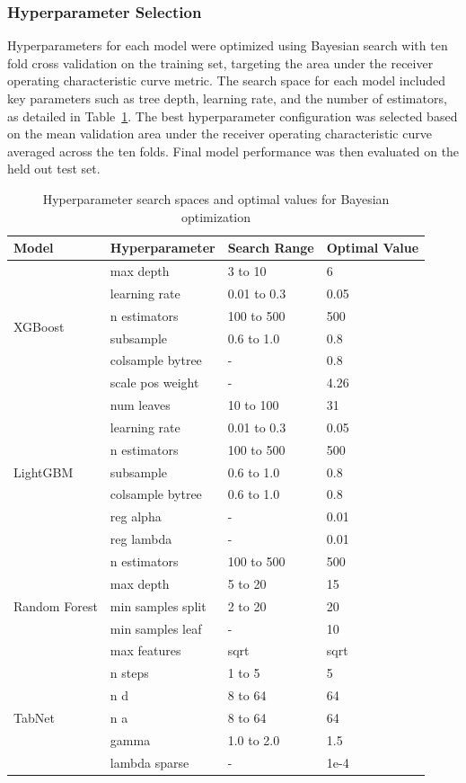 \documentclass[harvard,article]{frontiersinFPHY_FAMS}
\begin{document}
\subsubsection{Hyperparameter Selection}

Hyperparameters for each model were optimized using Bayesian search with ten fold cross validation on the training set, targeting the area under the receiver operating characteristic curve metric. The search space for each model included key parameters such as tree depth, learning rate, and the number of estimators, as detailed in Table~\ref{tab:hyperparameters}. The best hyperparameter configuration was selected based on the mean validation area under the receiver operating characteristic curve averaged across the ten folds. Final model performance was then evaluated on the held out test set.

\begin{table}[t]
\centering
\caption{Hyperparameter search spaces and optimal values for Bayesian optimization}
\label{tab:hyperparameters}
\begin{tabular}{l l l l}
\toprule
\textbf{Model} & \textbf{Hyperparameter} & \textbf{Search Range} & \textbf{Optimal Value} \\
\midrule
\multirow{6}{*}{XGBoost} & max depth & 3 to 10 & 6 \\
 & learning rate & 0.01 to 0.3 & 0.05 \\
 & n estimators & 100 to 500 & 500 \\
 & subsample & 0.6 to 1.0 & 0.8 \\
 & colsample bytree & - & 0.8 \\
 & scale pos weight & - & 4.26 \\
\midrule
\multirow{7}{*}{LightGBM} & num leaves & 10 to 100 & 31 \\
 & learning rate & 0.01 to 0.3 & 0.05 \\
 & n estimators & 100 to 500 & 500 \\
 & subsample & 0.6 to 1.0 & 0.8 \\
 & colsample bytree & 0.6 to 1.0 & 0.8 \\
 & reg alpha & - & 0.01 \\
 & reg lambda & - & 0.01 \\
\midrule
\multirow{5}{*}{Random Forest} & n estimators & 100 to 500 & 500 \\
 & max depth & 5 to 20 & 15 \\
 & min samples split & 2 to 20 & 20 \\
 & min samples leaf & - & 10 \\
 & max features & sqrt & sqrt \\
\midrule
\multirow{5}{*}{TabNet} & n steps & 1 to 5 & 5 \\
 & n d & 8 to 64 & 64 \\
 & n a & 8 to 64 & 64 \\
 & gamma & 1.0 to 2.0 & 1.5 \\
 & lambda sparse & - & 1e-4 \\
\bottomrule
\end{tabular}
\end{table}
\end{document}
